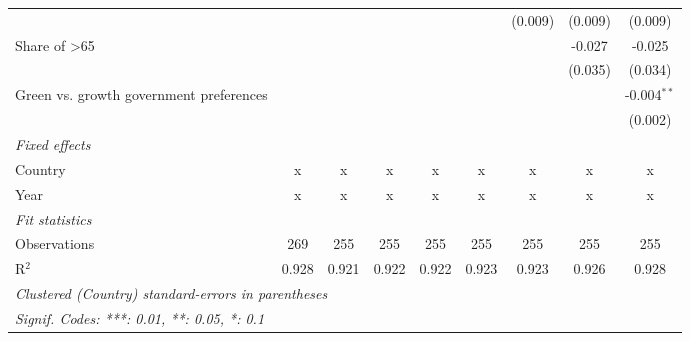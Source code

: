 \begin{table}[htbp]
\begin{tabular}{lcccccccc}
                                                  &              &             &         &         &         & (0.009) & (0.009) & (0.009)\\   
      Share of >65                                &              &             &         &         &         &         & -0.027  & -0.025\\   
                                                  &              &             &         &         &         &         & (0.035) & (0.034)\\   
      Green vs. growth government preferences     &              &             &         &         &         &         &         & -0.004$^{**}$\\   
                                                  &              &             &         &         &         &         &         & (0.002)\\   
      \emph{Fixed effects}\\
      Country                                     & x            & x           & x       & x       & x       & x       & x       & x\\  
      Year                                        & x            & x           & x       & x       & x       & x       & x       & x\\  
      \midrule \emph{Fit statistics}\\
      Observations                                & 269          & 255         & 255     & 255     & 255     & 255     & 255     & 255\\  
      R$^2$                                       & 0.928        & 0.921       & 0.922   & 0.922   & 0.923   & 0.923   & 0.926   & 0.928\\  
      \midrule
      \multicolumn{9}{l}{\emph{Clustered (Country) standard-errors in parentheses}}\\
      \multicolumn{9}{l}{\emph{Signif. Codes: ***: 0.01, **: 0.05, *: 0.1}}\\
   \end{tabular}
\end{table}


